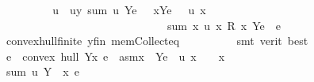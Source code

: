 \begin{isabellebody}
\ \ \ \ \ \ \isamarkupfalse%
\ \isamarkupfalse%
\ u\ \ uy{\isacharcolon}{\kern0pt}\ {\isachardoublequoteopen}{\isacharparenleft}{\kern0pt}sum\ u\ {\isacharparenleft}{\kern0pt}Y{\isacharminus}{\kern0pt}{\isacharbraceleft}{\kern0pt}e{\isacharbraceright}{\kern0pt}{\isacharparenright}{\kern0pt}\ {\isacharequal}{\kern0pt}\ {}{\isacharparenright}{\kern0pt}{\isachardoublequoteclose}\ {\isachardoublequoteopen}{\isacharparenleft}{\kern0pt}{\isasymforall}x{\isasymin}{\isacharparenleft}{\kern0pt}Y{\isacharminus}{\kern0pt}{\isacharbraceleft}{\kern0pt}e{\isacharbraceright}{\kern0pt}{\isacharparenright}{\kern0pt}{\isachardot}{\kern0pt}\ {}\ {\isasymle}\ u\ x{\isacharparenright}{\kern0pt}{\isachardoublequoteclose}\ \isanewline
\ \ \ \ \ \ \ \ \ \ \ \ \ \ \ \ \ \ \ \ \ \ \ \ \ \ \ \ \ \ {\isachardoublequoteopen}sum\ {\isacharparenleft}{\kern0pt}{\isasymlambda}x{\isachardot}{\kern0pt}\ u\ x\ {\isacharasterisk}{\kern0pt}\isactrlsub R\ x{\isacharparenright}{\kern0pt}\ {\isacharparenleft}{\kern0pt}Y{\isacharminus}{\kern0pt}{\isacharbraceleft}{\kern0pt}e{\isacharbraceright}{\kern0pt}{\isacharparenright}{\kern0pt}\ {\isacharequal}{\kern0pt}\ e{\isachardoublequoteclose}\ \isanewline
\ \ \ \ \ \ \ \ \isamarkupfalse%
\ convex{\isacharunderscore}{\kern0pt}hull{\isacharunderscore}{\kern0pt}finite\ y{\isacharunderscore}{\kern0pt}fin\ mem{\isacharunderscore}{\kern0pt}Collect{\isacharunderscore}{\kern0pt}eq\isanewline
\ \ \ \ \ \ \ \ \isamarkupfalse%
\ {\isacharparenleft}{\kern0pt}smt\ {\isacharparenleft}{\kern0pt}verit{\isacharcomma}{\kern0pt}\ best{\isacharparenright}{\kern0pt}{\isacharparenright}{\kern0pt}\isanewline
\ \ \ \ \ \ \isamarkupfalse%
\ {\isachardoublequoteopen}e\ {\isasymin}\ convex\ hull\ {\isacharparenleft}{\kern0pt}Y{\isacharminus}{\kern0pt}{\isacharbraceleft}{\kern0pt}x{\isacharcomma}{\kern0pt}\ e{\isacharbraceright}{\kern0pt}{\isacharparenright}{\kern0pt}{\isachardoublequoteclose}\ \ asm{\isacharcolon}{\kern0pt}{\isachardoublequoteopen}x\ {\isasymin}\ {\isacharparenleft}{\kern0pt}Y{\isacharminus}{\kern0pt}{\isacharbraceleft}{\kern0pt}e{\isacharbraceright}{\kern0pt}{\isacharparenright}{\kern0pt}\ {\isasymand}\ u\ x\ {\isacharequal}{\kern0pt}\ {}{\isachardoublequoteclose}\ \ x\isanewline
\ \ \ \ \ \ \isamarkupfalse%
{\isacharminus}{\kern0pt}\isanewline
\ \ \ \ \ \ \ \ \isamarkupfalse%
\ {}{\isacharcolon}{\kern0pt}{\isachardoublequoteopen}sum\ u\ {\isacharparenleft}{\kern0pt}Y\ {\isacharminus}{\kern0pt}\ {\isacharbraceleft}{\kern0pt}x{\isacharcomma}{\kern0pt}\ e{\isacharbraceright}{\kern0pt}{\isacharparenright}{\kern0pt}\ {\isacharequal}{\kern0pt}\ {}{\isachardoublequoteclose}\isanewline

\end{isabellebody}

